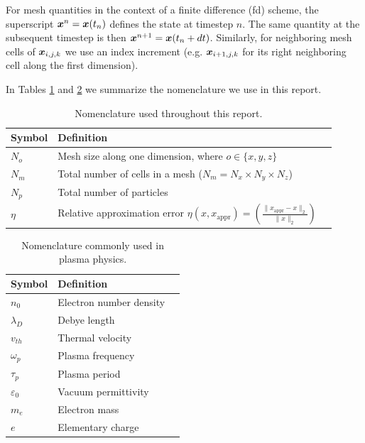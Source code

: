 For mesh quantities in the context of a finite difference (\gls{fd}) scheme, the superscript $\boldsymbol{x}^n = \boldsymbol{x}(t_n)$ defines the state
at timestep $n$. The same quantity at the subsequent timestep is then $\boldsymbol{x}^{n+1} = \boldsymbol{x}(t_n + dt)$.
Similarly, for neighboring mesh cells of $\boldsymbol{x}_{i,j,k}$ we use an index increment (e.g. $\boldsymbol{x}_{i+1,j,k}$ for its right neighboring cell along the first dimension).

In Tables \ref{table:nomenclature} and \ref{table:plasma_nomenclature} we summarize the nomenclature
we use in this report.

\begin{table}[h]
    \centering
    \caption{Nomenclature used throughout this report.}
    \begin{tabularx}{0.75\textwidth}{l l l}
        \toprule
        Symbol & Definition \\
        \midrule
        $N_{o}$ & Mesh size along one dimension, where $o \in \{x,y,z\}$ \\
        $N_m$ & Total number of cells in a mesh ($N_m = N_x \times N_y \times N_z$) \\
        $N_p$ & Total number of particles \\
        $\eta$ & Relative approximation error $\eta(x, x_{\text{appr}}) = \left(\frac{\lVert x_{\text{appr}}-x \rVert_2}{\lVert x
            \rVert_2} \right)$\\
        \bottomrule
    \end{tabularx}
    \label{table:nomenclature}
\end{table}

\begin{table}[h]
    \centering
    \caption{Nomenclature commonly used in plasma physics.}
    \begin{tabularx}{0.75\textwidth}{l l l}
        \toprule
        Symbol & Definition \\
        \midrule
        $n_0$ & Electron number density\\
        $\lambda_D$ & Debye length \\
        $v_{th}$ & Thermal velocity \\
        $\omega_{p}$ & Plasma frequency \\
        $\tau_{p}$ & Plasma period \\
        $\varepsilon_{0}$ & Vacuum permittivity \\
        $m_e$ & Electron mass \\
        $e$ & Elementary charge \\
        \bottomrule
    \end{tabularx}
    \label{table:plasma_nomenclature}
\end{table}


